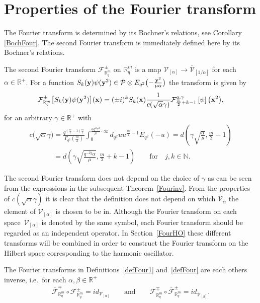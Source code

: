 \documentclass[pdftex]{sigma}
\newcommand{\mR}{\mathbb{R}}
\newcommand{\mN}{\mathbb{N}}
\newcommand{\cF}{\mathcal{F}}
\newcommand{\cP}{\mathcal{P}}
\newcommand{\cV}{\mathcal{V}}
\numberwithin{equation}{section}
\begin{document}
\section{Properties of the Fourier transform}
\label{behave}



The Fourier transform is determined by its Bochner's relations, see Corollary \ref{BochFour}. The second Fourier transform is immediately def\/ined here by its Bochner's relations.
\begin{definition}
\label{defFour}
The second Fourier transform $\cF^{\pm}_{\mR^m_q}$ on $\mR^m_q$ is a map $\cV_{[\alpha]}\to\overline{\cV}_{[1/\alpha]}$ for each $\alpha\in\mR^+$. For a function $S_k(\bold{y})\psi(\bold{y}^2)\in\cP\otimes E_{q^2}\big({-}\frac{\bold{y}^2}{\mu\alpha}\big)$ the transform is given by
\begin{gather*}
\cF^{\pm}_{\mR^m_q}\big[S_k(\bold{y})\psi(\bold{y}^2)\big](\bold{x}) = (\pm i)^kS_k(\bold{x})\frac{1}{c(\sqrt{\alpha}\gamma)}\cF^{q,\gamma}_{\frac{m}{2}+k-1}\left[\psi\right]\big(\bold{x}^2\big),
\end{gather*}
for an arbitrary $\gamma\in\mR^+$ with
\begin{gather*}
c\big(\sqrt{\alpha}\gamma\big) = \frac{q^{(\frac{m}{2}-1)\frac{m}{2}}}{\Gamma_{q^2}(\frac{m}{2})}\int_0^{\frac{\alpha q^2\gamma^2 }{\mu}\cdot\infty}d_{q^2}u u^{\frac{m}{2}-1}E_{q^2}(-u)=d\left(\gamma\sqrt{\frac{\alpha}{\mu}},\frac{m}{2}-1\right)\\
 \phantom{c\big(\sqrt{\alpha}\gamma\big)}{}
 = d\left(\gamma\sqrt{\frac{q^{-2j}\alpha}{\mu}},\frac{m}{2}+k-1\right)\qquad\mbox{for} \quad j,k\in\mN.
\end{gather*}
\end{definition}
The second Fourier transform does not depend on the choice of $\gamma$ as can be seen from the expressions in the subsequent Theorem~\ref{Fourinv}. From the properties of $c(\sqrt{\alpha}\gamma)$ it is clear that the def\/inition does not depend on which $\cV_\alpha$ the element of $\cV_{[\alpha]}$ is chosen to be in. Although the Fourier transform on each space~$\cV_{[\alpha]}$ is denoted by the same symbol, each Fourier transform should be regarded as an independent operator. In Section~\ref{FourHO} these dif\/ferent transforms will be combined in order to construct the Fourier transform on the Hilbert space corresponding to the harmonic oscillator.


\begin{theorem}
\label{Fourinv}
The Fourier transforms in Definitions~{\rm \ref{defFour1}} and~{\rm \ref{defFour}} are each others inverse, i.e.\ for each $\alpha,\beta\in\mR^+$
\begin{gather*}
\overline{\cF}_{\mR^m_q}^{\mp}\circ\cF^{\pm}_{\mR^m_q} = id_{\cV_{[\alpha]}}\qquad\mbox{and}\qquad
\cF_{\mR^m_q}^{\mp}\circ\overline{\cF}^{\pm}_{\mR^m_q} = id_{\overline{\cV}_{[\beta]}}.
\end{gather*}
\end{theorem}
\end{document}
